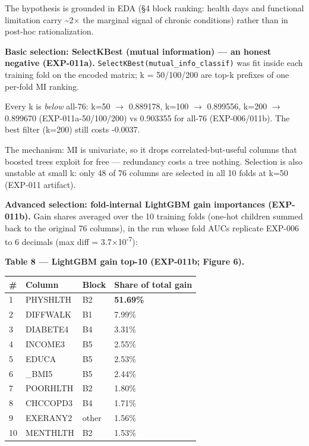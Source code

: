 \documentclass[11pt,a4paper]{article}
\begin{document}
The hypothesis is grounded in EDA (\S{}4 block ranking: health days and
functional limitation carry \textasciitilde2$\times$ the marginal signal of
chronic conditions) rather than in post-hoc rationalization.

\textbf{Basic selection: SelectKBest (mutual information) --- an honest
negative (EXP-011a).} \texttt{SelectKBest(mutual\_info\_classif)} was
fit inside each training fold on the encoded matrix; k = 50/100/200 are
top-k prefixes of one per-fold MI ranking.

Every k is \emph{below} all-76: k=50 $\rightarrow$ 0.889178, k=100 $\rightarrow$ 0.899556, k=200
$\rightarrow$ 0.899670 (EXP-011a-50/100/200) vs 0.903355 for all-76 (EXP-006/011b).
The best filter (k=200) still costs -0.0037.

The mechanism: MI is univariate, so it drops correlated-but-useful
columns that boosted trees exploit for free --- redundancy costs a tree
nothing. Selection is also unstable at small k: only 48 of 76 columns
are selected in all 10 folds at k=50 (EXP-011 artifact).

\textbf{Advanced selection: fold-internal LightGBM gain importances
(EXP-011b).} Gain shares averaged over the 10 training folds (one-hot
children summed back to the original 76 columns), in the run whose fold
AUCs replicate EXP-006 to 6 decimals (max \textbar diff\textbar{} =
3.7$\times$10\textsuperscript{-}\textsuperscript{7}):

\textbf{Table 8 --- LightGBM gain top-10 (EXP-011b; Figure 6).}

{\def\LTcaptype{none} %

\begin{center}\small
\begin{tabular}{@{}llll@{}}
\toprule\noalign{}
\# & Column & Block & Share of total gain \\
\midrule\noalign{}
1 & PHYSHLTH & B2 & \textbf{51.69\%} \\
2 & DIFFWALK & B1 & 7.99\% \\
3 & DIABETE4 & B4 & 3.31\% \\
4 & INCOME3 & B5 & 2.55\% \\
5 & EDUCA & B5 & 2.53\% \\
6 & \_BMI5 & B5 & 2.44\% \\
7 & POORHLTH & B2 & 1.80\% \\
8 & CHCCOPD3 & B4 & 1.71\% \\
9 & EXERANY2 & other & 1.56\% \\
10 & MENTHLTH & B2 & 1.53\% \\
\bottomrule
\end{tabular}
\end{center}

}
\end{document}
